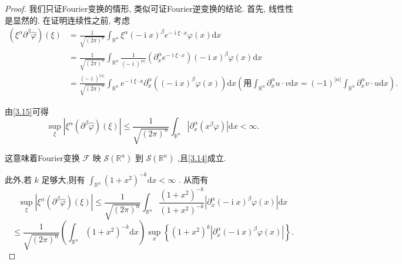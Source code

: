 \documentclass[lang=cn,newtx,10pt,scheme=chinese,thmcnt=chapter]{elegantbook}
\newcommand{\dif}{\mathrm{d}}
\newcommand{\ci}{\operatorname{i}}
\begin{document}
\begin{proof}
  我们只证Fourier变换的情形, 类似可证Fourier逆变换的结论. 首先, 线性性是显然的. 在证明连续性之前, 考虑
\begin{equation}
\begin{aligned}
    \left( {{\xi }^{\alpha }{\partial }^{\beta }\widehat{\varphi }}\right) \left( \xi \right)  &= \frac{1}{\sqrt{{\left( 2\pi \right) }^{n}}}{\int }_{{\mathbb{R}}^{n}}{\xi }^{\alpha }{\left( -\ci x\right) }^{\beta }{e}^{-{\ci\xi } \cdot  x}\varphi \left( x\right) {\dif x}
\\&= \frac{1}{\sqrt{{\left( 2\pi \right) }^{n}}}{\int }_{{\mathbb{R}}^{n}}\frac{1}{{\left( -\ci\right) }^{\left| \alpha \right| }}\left( {{\partial }_{x}^{\alpha }{e}^{-{\ci\xi } \cdot  x}}\right) {\left( -\ci x\right) }^{\beta }\varphi \left( x\right) {\dif x}
\\&= \frac{{\left( -\ci\right) }^{\left| \alpha \right| }}{\sqrt{{\left( 2\pi \right) }^{n}}}{\int }_{{\mathbb{R}}^{n}}{e}^{-{\ci\xi } \cdot  x}{\partial }_{x}^{\alpha }\left( {{\left( -\ci x\right) }^{\beta }\varphi \left( x\right) }\right) {\dif x}(\text{用}\int_{\mathbb{R}^n}\partial^\alpha_xu\cdot v\dif x=(-1)^{|\alpha|}\int_{\mathbb{R}^n}\partial^\alpha_xv\cdot u\dif x). \label{3.15}
\end{aligned}
\end{equation}

由\ref{3.15}可得
\begin{equation*}
\mathop{\sup }\limits_{\xi }\left| {{\xi }^{\alpha }\left( {{\partial }^{\beta }\widehat{\varphi }}\right) \left( \xi \right) }\right|  \leqslant  \frac{1}{\sqrt{{\left( 2\pi \right) }^{n}}}{\int }_{{\mathbb{R}}^{n}}\left| {{\partial }_{x}^{\alpha }\left( {{x}^{\beta }\varphi }\right) }\right| {\dif x} < \infty .
\end{equation*}

这意味着Fourier变换 \(\mathcal{F}\) 映 \(\mathcal{S}\left( {\mathbb{R}}^{n}\right)\) 到 \(\mathcal{S}\left( {\mathbb{R}}^{n}\right)\) ,且\ref{3.14}成立.

此外,若 \(k\) 足够大,则有 \({\int }_{{\mathbb{R}}^{n}}{\left( 1 + {x}^{2}\right) }^{-k}{\dif x} < \infty\) . 从而有
\begin{equation*}
\mathop{\sup }\limits_{\xi }\left| {{\xi }^{\alpha }\left( {{\partial }^{\beta }\widehat{\varphi }}\right) \left( \xi \right) }\right|  \leqslant  \frac{1}{\sqrt{{\left( 2\pi \right) }^{n}}}{\int }_{{\mathbb{R}}^{n}}\frac{{\left( 1 + {x}^{2}\right) }^{-k}}{{\left( 1 + {x}^{2}\right) }^{-k}}\left| {{\partial }_{x}^{\alpha }{\left( -\ci x\right) }^{\beta }\varphi \left( x\right) }\right| {\dif x}
\end{equation*}
\begin{equation*}
\leqslant  \frac{1}{\sqrt{{\left( 2\pi \right) }^{n}}}\left( {{\int }_{{\mathbb{R}}^{n}}{\left( 1 + {x}^{2}\right) }^{-k}{\dif x}}\right) \mathop{\sup }\limits_{x}\left\{  {{\left( 1 + {x}^{2}\right) }^{k}\left| {{\partial }_{x}^{\alpha }{\left( -\ci x\right) }^{\beta }\varphi \left( x\right) }\right| }\right\}  .
\end{equation*}


\end{proof}
\end{document}
